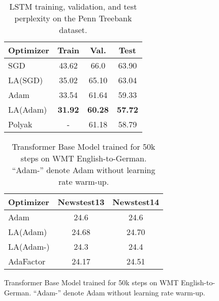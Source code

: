 \documentclass{article}
\begin{document}
\begin{figure}[t]
\begin{minipage}[t]{0.48 \linewidth}
\begin{table}[H]
\caption{LSTM training, validation, and test perplexity on the Penn Treebank dataset.}
\label{tab:lstm}
\vskip 0.1in
\begin{center}
\begin{small}
\begin{sc}
\begin{tabular}{l c c c }
\toprule
Optimizer & Train & Val. & Test  \\
\midrule
SGD & 43.62 & 66.0 & 63.90 \\
LA(SGD) & 35.02 & 65.10 & 63.04 \\ 
Adam & 33.54 & 61.64 & 59.33 \\
LA(Adam) & \textbf{31.92} & \textbf{60.28} & \textbf{57.72} \\
Polyak & - & 61.18 & 58.79 \\ 
\bottomrule
\end{tabular}
\end{sc}
\end{small}
\end{center}
\vskip -0.1in
\end{table}
\end{minipage}
\hfill
\begin{minipage}[t]{0.48 \linewidth}
\begin{table}[H]
\caption{Transformer Base Model trained for 50k steps on WMT English-to-German. ``Adam-'' denote Adam without learning rate warm-up.}
\label{tab:ntm}
\vskip 0.1in
\begin{center}
\begin{small}
\begin{sc}
\begin{tabular}{l c c }
\toprule
Optimizer & Newstest13 & Newstest14   \\
\midrule
Adam & 24.6 & 24.6 \\
LA(Adam) & 24.68 & 24.70 \\ 
LA(Adam-) & 24.3 & 24.4 \\
AdaFactor & 24.17 & 24.51 \\
\bottomrule
\end{tabular}
\end{sc}
\end{small}
\end{center}
\vskip -0.1in
\end{table}
\end{minipage}
\end{figure}
\end{document}
